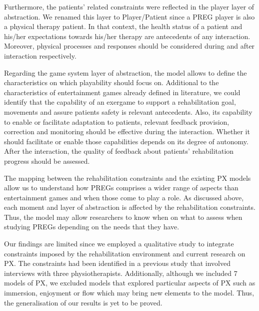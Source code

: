 Furthermore, the patients' related constraints were reflected in the player layer of abstraction. We renamed this layer to Player/Patient since a \ac{PREG} player is also a physical therapy patient. In that context, the health status of a patient and his/her expectations towards his/her therapy are antecedents of any interaction. Moreover, physical processes and responses should be considered during and after interaction respectively.

Regarding the game system layer of abstraction, the model allows to define the characteristics on which playability should focus on. Additional to the characteristics of entertainment games already defined in literature, we could identify that the capability of an exergame to support a rehabilitation goal, movements and assure patients safety is relevant antecedents. Also, its capability to enable or facilitate adaptation to patients, relevant feedback provision, correction and monitoring should be effective during the interaction. Whether it should facilitate or enable those capabilities depends on its degree of autonomy. After the interaction, the quality of feedback about patients' rehabilitation progress should be assessed.

The mapping between the rehabilitation constraints and the existing \ac{PX} models allow us to understand how \acp{PREG} comprises a wider range of aspects than entertainment games and when those come to play a role. As discussed above, each moment and layer of abstraction is affected by the rehabilitation constraints. Thus, the model may allow researchers to know when on what to assess when studying \acp{PREG} depending on the needs that they have.



Our findings are limited since we employed a qualitative study to integrate constraints imposed by the rehabilitation environment and current research on \ac{PX}. The constraints had been identified in a previous study that involved interviews with three physiotherapists. Additionally, although we included 7 models of \ac{PX}, we excluded models that explored particular aspects of \ac{PX} such as immersion, enjoyment or flow which may bring new elements to the model. Thus, the generalisation of our results is yet to be proved.

